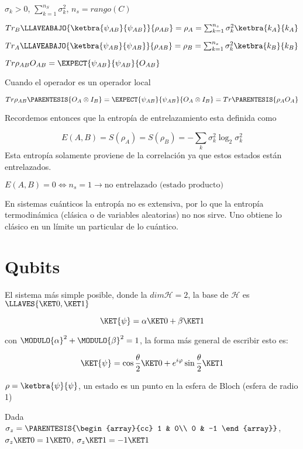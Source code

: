 $\sigma_{k}>0$, $\sum_{k=1}^{n_{S}}\sigma_{k}^{2}$, $n_{s}=rango(C)$

$Tr_{B}\LLAVEABAJO{\ketbra{\psi_{AB}}{\psi_{AB}}}{\rho_{AB}}=\rho_{A}=\sum_{k=1}^{n_{s}}\sigma_{k}^{2}\ketbra{k_{A}}{k_{A}}$

$Tr_{A}\LLAVEABAJO{\ketbra{\psi_{AB}}{\psi_{AB}}}{\rho_{AB}}=\rho_{B}=\sum_{k=1}^{n_{s}}\sigma_{k}^{2}\ketbra{k_{B}}{k_{B}}$

$Tr\rho_{AB}O_{AB}=\EXPECT{\psi_{AB}}{\psi_{AB}}{O_{AB}}$

Cuando el operador es un operador local

$Tr\rho_{AB}\PARENTESIS{O_{A}\otimes I_{B}}=\EXPECT{\psi_{AB}}{\psi_{AB}}{O_{A}\otimes I_{B}}=Tr\PARENTESIS{\rho_{A}O_{A}}$

Recordemos entonces que la entropía de entrelazamiento esta definida
como

\[
E(A,B)=S(\rho_{A})=S(\rho_{B})=-\sum_{k}\sigma_{k}^{2}\log_{2}\sigma_{k}^{2}
\]
 Esta entropía solamente proviene de la correlación ya que estos estados
están entrelazados.

$E(A,B)=0\iff n_{s}=1\rightarrow\text{no entrelazado (estado producto)}$

En sistemas cuánticos la entropía no es extensiva, por lo que la entropía
termodinámica (clásica o de variables aleatorias) no nos sirve. Uno
obtiene lo clásico en un límite un particular de lo cuántico.

\section{Qubits}

El sistema más simple posible, donde la $dim\mathcal{H}=2$, la base
de $\mathcal{H}$ es $\LLAVES{\KET 0,\KET 1}$

\[
\KET{\psi}=\alpha\KET 0+\beta\KET 1
\]

con $\MODULO{\alpha}^{2}+\MODULO{\beta}^{2}=1$, la forma más general
de escribir esto es:

\[
\KET{\psi}=\cos\frac{\theta}{2}\KET 0+e^{i\varphi}\sin\frac{\theta}{2}\KET 1
\]

$\rho=\ketbra{\psi}{\psi}$, un estado es un punto en la esfera de
Bloch (esfera de radio 1)

Dada $\sigma_{z}=\PARENTESIS{\begin{array}{cc}
1 & 0\\
0 & -1
\end{array}}$, $\sigma_{z}\KET 0=1\KET 0$, $\sigma_{z}\KET 1=-1\KET 1$

